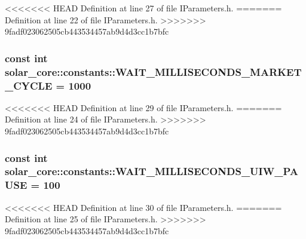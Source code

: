 <<<<<<< HEAD
Definition at line 27 of file I\+Parameters.\+h.
=======
Definition at line 22 of file I\+Parameters.\+h.
>>>>>>> 9fadf023062505cb443534457ab9d4d3cc1b7bfc

\hypertarget{namespacesolar__core_1_1constants_ab3dddf011f92328166c5f93e3951107e}{}
\subsubsection[{W\+A\+I\+T\+\_\+\+M\+I\+L\+L\+I\+S\+E\+C\+O\+N\+D\+S\+\_\+\+M\+A\+R\+K\+E\+T\+\_\+\+C\+Y\+C\+L\+E}]{\setlength{\rightskip}{0pt plus 5cm}const int solar\+\_\+core\+::constants\+::\+W\+A\+I\+T\+\_\+\+M\+I\+L\+L\+I\+S\+E\+C\+O\+N\+D\+S\+\_\+\+M\+A\+R\+K\+E\+T\+\_\+\+C\+Y\+C\+L\+E = 1000}\label{namespacesolar__core_1_1constants_ab3dddf011f92328166c5f93e3951107e}


<<<<<<< HEAD
Definition at line 29 of file I\+Parameters.\+h.
=======
Definition at line 24 of file I\+Parameters.\+h.
>>>>>>> 9fadf023062505cb443534457ab9d4d3cc1b7bfc

\hypertarget{namespacesolar__core_1_1constants_abebba44aef8bbf544a330b8b20229320}{}
\subsubsection[{W\+A\+I\+T\+\_\+\+M\+I\+L\+L\+I\+S\+E\+C\+O\+N\+D\+S\+\_\+\+U\+I\+W\+\_\+\+P\+A\+U\+S\+E}]{\setlength{\rightskip}{0pt plus 5cm}const int solar\+\_\+core\+::constants\+::\+W\+A\+I\+T\+\_\+\+M\+I\+L\+L\+I\+S\+E\+C\+O\+N\+D\+S\+\_\+\+U\+I\+W\+\_\+\+P\+A\+U\+S\+E = 100}\label{namespacesolar__core_1_1constants_abebba44aef8bbf544a330b8b20229320}


<<<<<<< HEAD
Definition at line 30 of file I\+Parameters.\+h.
=======
Definition at line 25 of file I\+Parameters.\+h.
>>>>>>> 9fadf023062505cb443534457ab9d4d3cc1b7bfc

